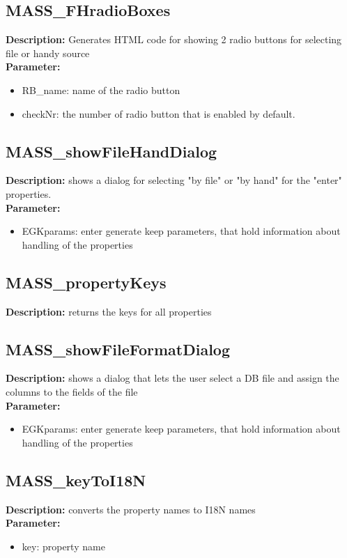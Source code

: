 \subsection{MASS\_FHradioBoxes}
\textbf{Description:} Generates HTML code for showing 2 radio buttons for selecting file or handy source \\
\textbf{Parameter:}
\begin{itemize}
\item RB\_name: name of the radio button
\item checkNr: the number of radio button that is enabled by default.
\end{itemize}

\subsection{MASS\_showFileHandDialog}
\textbf{Description:} shows a dialog for selecting "by file" or "by hand" for the "enter" properties.\\
\textbf{Parameter:}
\begin{itemize}
\item EGKparams: enter generate keep parameters, that hold information about handling of the properties
\end{itemize}

\subsection{MASS\_propertyKeys}
\textbf{Description:} returns the keys for all properties\\

\subsection{MASS\_showFileFormatDialog}
\textbf{Description:} shows a dialog that lets the user select a DB file and assign the columns to the fields of the file\\
\textbf{Parameter:}
\begin{itemize}
\item EGKparams: enter generate keep parameters, that hold information about handling of the properties
\end{itemize}

\subsection{MASS\_keyToI18N}
\textbf{Description:} converts the property names to I18N names\\
\textbf{Parameter:}
\begin{itemize}
\item key: property name
\end{itemize}

